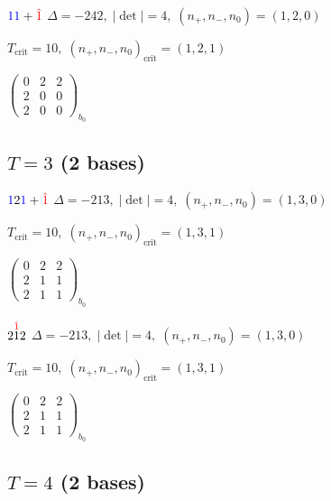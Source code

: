 \documentclass[10pt]{article}
\begin{document}
$\textcolor{blue}{1}\textcolor{blue}{1}+\textcolor{red}{\hat{1}}$ \quad $\Delta=-242,\; |\det|=4,\; (n_+,n_-,n_0)=(1,2,0)$

\hspace{1em}$T_{\text{crit}}=10,\; (n_+,n_-,n_0)_{\text{crit}}=(1,2,1)$

\hspace{2em}$\left(\begin{smallmatrix}0 & 2 & 2 \\ 2 & 0 & 0 \\ 2 & 0 & 0\end{smallmatrix}\right)_{\!b_0}$


\subsection*{$T = 3$ \quad (2 bases)}
\smallskip

$\textcolor{blue}{1}2\textcolor{blue}{1}+\textcolor{red}{\hat{1}}$ \quad $\Delta=-213,\; |\det|=4,\; (n_+,n_-,n_0)=(1,3,0)$

\hspace{1em}$T_{\text{crit}}=10,\; (n_+,n_-,n_0)_{\text{crit}}=(1,3,1)$

\hspace{2em}$\left(\begin{smallmatrix}0 & 2 & 2 \\ 2 & 1 & 1 \\ 2 & 1 & 1\end{smallmatrix}\right)_{\!b_0}$

\smallskip

$2\overset{\textcolor{red}{\hat{1}}}{1}2$ \quad $\Delta=-213,\; |\det|=4,\; (n_+,n_-,n_0)=(1,3,0)$

\hspace{1em}$T_{\text{crit}}=10,\; (n_+,n_-,n_0)_{\text{crit}}=(1,3,1)$

\hspace{2em}$\left(\begin{smallmatrix}0 & 2 & 2 \\ 2 & 1 & 1 \\ 2 & 1 & 1\end{smallmatrix}\right)_{\!b_0}$


\subsection*{$T = 4$ \quad (2 bases)}
\smallskip
\end{document}
